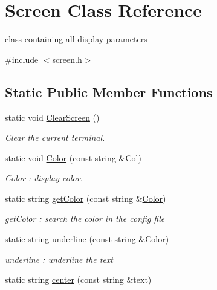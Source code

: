 \hypertarget{class_screen}{}\section{Screen Class Reference}
\label{class_screen}


class containing all display parameters  




{\ttfamily \#include $<$screen.\+h$>$}

\subsection*{Static Public Member Functions}
\begin{DoxyCompactItemize}
\item 
\mbox{\label{class_screen_a3d449fc28841fbdce766585085055cba}} 
static void \hyperlink{class_screen_a3d449fc28841fbdce766585085055cba}{Clear\+Screen} ()
\begin{DoxyCompactList}\small\item\em Clear the current terminal. \end{DoxyCompactList}\item 
static void \hyperlink{class_screen_a9b42301ad973ab952895ef1c3f2ca172}{Color} (const string \&Col)
\begin{DoxyCompactList}\small\item\em Color \+: display color. \end{DoxyCompactList}\item 
static string \hyperlink{class_screen_a664156637aa90c77ee9e8719abb4e014}{get\+Color} (const string \&\hyperlink{class_screen_a9b42301ad973ab952895ef1c3f2ca172}{Color})
\begin{DoxyCompactList}\small\item\em get\+Color \+: search the color in the config file \end{DoxyCompactList}\item 
static string \hyperlink{class_screen_a60872d6d9e17da898f53889f6cb2e291}{underline} (const string \&\hyperlink{class_screen_a9b42301ad973ab952895ef1c3f2ca172}{Color})
\begin{DoxyCompactList}\small\item\em underline \+: underline the text \end{DoxyCompactList}\item 
static string \hyperlink{class_screen_a4e9f61880e53dbb68d7bc6a684f4e779}{center} (const string \&text)

\end{DoxyCompactItemize}
